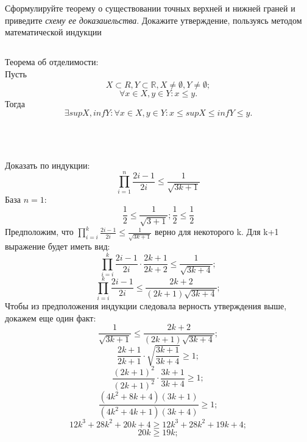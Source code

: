 \section{}
Сформулируйте теорему о существовании точных верхней и нижней граней и приведите \textit{схему ее доказаиельства}. Докажите утверждение, пользуясь методом математической индукции

\subsection{}
	Теорема об отделимости:\\
	Пусть $$X \subset R, Y\subset \mathbb{R}, X \neq \emptyset, Y\neq\emptyset;$$
	$$\forall x\in X, y\in Y: x\leq y.$$
	Тогда $$\exists supX, infY: \forall x\in X, y\in Y: x\leq supX\leq infY\leq y.$$
	\\\\
\subsection{}
	Доказать по индукции: $$\prod_{i=1}^n\frac{2i - 1}{2i}\leq\frac{1}{\sqrt{3k+1}}$$
	База $n = 1$:
	$$\frac{1}{2}\leq\frac{1}{\sqrt{3+1}}; \frac{1}{2}\leq\frac{1}{2}$$
	Предположим, что $\prod_{i=i}^{k}\frac{2i - 1}{2i}\leq\frac{1}{\sqrt{3k+1}}$ верно для некоторого k. Для k+1 выражение будет иметь вид:
	$$\prod_{i=i}^{k}\frac{2i - 1}{2i}\cdot\frac{2k + 1}{2k+2}\leq\frac{1}{\sqrt{3k+4}};$$
	$$\prod_{i=i}^{k}\frac{2i - 1}{2i}\leq\frac{2k + 2}{(2k+1)\sqrt{3k+4}};$$
	Чтобы из предположения индукции следовала верность утверждения выше, докажем еще один факт:
	$$\frac{1}{\sqrt{3k+1}}\leq\frac{2k + 2}{(2k+1)\sqrt{3k+4}};$$
	$$\frac{2k+1}{2k+1}\cdot\sqrt{\frac{3k + 1}{3k+4}}\geq 1;$$
	$$\frac{(2k+1)^2}{(2k+1)^2}\cdot\frac{3k + 1}{3k+4}\geq 1;$$
	$$\frac{(4k^2+8k+4)(3k+1)}{(4k^2+4k+1)(3k+4)}\geq 1;$$
	$$12k^3+28k^2+20k+4\geq 12k^3+28k^2+19k+4;$$
	$$20k\geq 19k;$$
	\\\\
